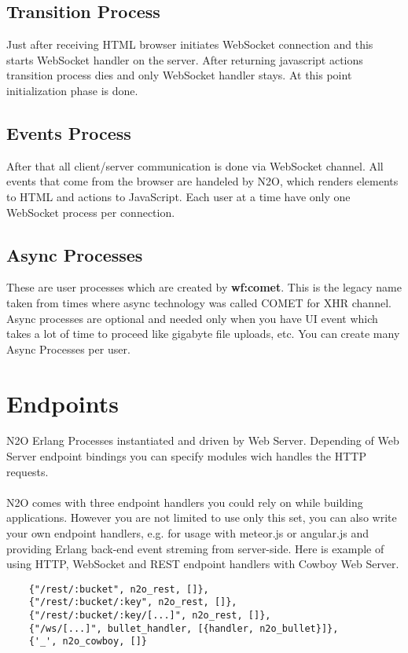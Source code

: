 \subsection{Transition Process}
Just after receiving HTML browser initiates WebSocket connection
and this starts WebSocket handler on the server. After returning
javascript actions transition process dies and only WebSocket handler stays.
At this point initialization phase is done.

\subsection{Events Process}
After that all client/server communication is done via
WebSocket channel. All events that come from the browser are
handeled by N2O, which renders elements to HTML and actions to
JavaScript. Each user at a time have only one WebSocket process
per connection.

\subsection{Async Processes}
These are user processes which are created by {\bf wf:comet}.
This is the legacy name taken from times where async technology
was called COMET for XHR channel. Async processes are optional
and needed only when you have UI event which takes a lot of
time to proceed like gigabyte file uploads, etc. You can create
many Async Processes per user.

\section{Endpoints}
N2O Erlang Processes instantiated and driven by Web Server.
Depending of Web Server endpoint bindings you can specify
modules wich handles the HTTP requests.

\paragraph{}
N2O comes with three endpoint handlers you could rely on while building
applications. However you are not limited to use only this set,
you can also write your own endpoint handlers, e.g. for usage with
meteor.js or angular.js and providing Erlang back-end event streming
from server-side. Here is example of using HTTP, WebSocket and
REST endpoint handlers with Cowboy Web Server.

\vspace{1\baselineskip}
\begin{lstlisting}
    {"/rest/:bucket", n2o_rest, []},
    {"/rest/:bucket/:key", n2o_rest, []},
    {"/rest/:bucket/:key/[...]", n2o_rest, []},
    {"/ws/[...]", bullet_handler, [{handler, n2o_bullet}]},
    {'_', n2o_cowboy, []}
\end{lstlisting}

